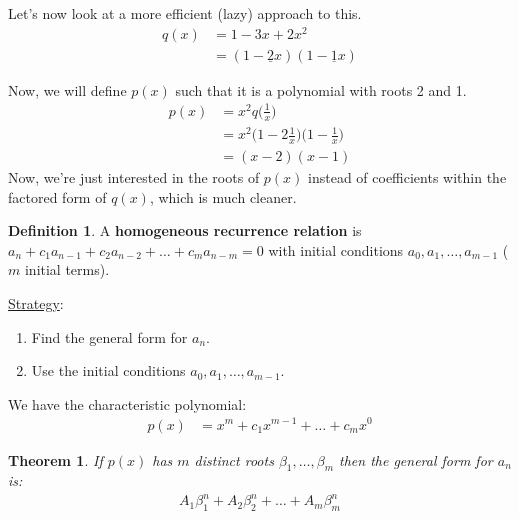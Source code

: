 \documentclass[]{article}
\newtheorem*{theorem}{Theorem}
\theoremstyle{definition}
\newtheorem*{defn}{Definition}
\begin{document}
		Let's now look at a more efficient (lazy) approach to this.
		\begin{align*}
			q(x) &= 1 - 3x + 2x^2 \\
			&= (1 - \underline{2}x)(1 - \underline{1}x)
		\end{align*}

		Now, we will define $p(x)$ such that it is a polynomial with roots 2 and 1.
		\begin{align*}
			p(x) &= x^2 q\bigg(\frac{1}{x}\bigg) \\
			&= x^2 \bigg( 1 - 2 \frac{1}{x}\bigg) \bigg(1 - \frac{1}{x}\bigg) \\
			&= (x - 2)(x - 1)
		\end{align*}
		Now, we're just interested in the roots of $p(x)$ instead of coefficients within the factored form of $q(x)$, which is much cleaner.

		\begin{defn}
			A \textbf{homogeneous recurrence relation} is $a_n + c_1 a_{n - 1} + c_2 a_{n - 2} + \ldots + c_m a_{n - m} = 0$ with initial conditions $a_0, a_1, \ldots, a_{m - 1}$ ($m$ initial terms).
		\end{defn}

		\underline{Strategy}:
		\begin{enumerate}
			\item Find the general form for $a_n$.
			\item Use the initial conditions $a_0, a_1, \ldots, a_{m - 1}$.
		\end{enumerate}

		We have the characteristic polynomial:
		\begin{align*}
			p(x) &= x^m + c_1 x^{m - 1} + \ldots + c_m x^0
		\end{align*}

		\begin{theorem}
			If $p(x)$ has $m$ distinct roots $\beta_1, \ldots, \beta_m$ then the general form for $a_n$ is:
			\begin{align*}
				A_1 \beta_1^n + A_2 \beta_2^n + \ldots + A_m \beta_m^n
			\end{align*}
		\end{theorem}
\end{document}
